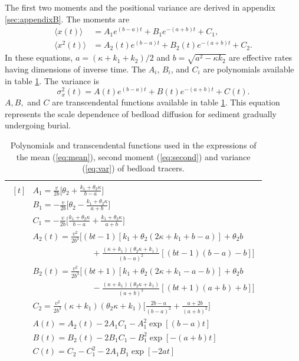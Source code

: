 \documentclass[draft,grl]{agujournal2018}
\newcommand\be{\begin{equation}}
\newcommand\ee{\end{equation}}
\newcommand\bra{\langle}
\newcommand\ket{\rangle}
\begin{document}
 The first two moments and the positional variance are derived in appendix \ref{sec:appendixB}.
The moments are
\begin{align}
\bra x(t) \ket &= A_1 e^{(b-a)t}+B_1e^{-(a+b)t}+C_1, \label{eq:mean}\\
\bra x^2(t) \ket &= A_2(t)e^{(b-a)t}+B_2(t)e^{-(a+b)t}+C_2. \label{eq:second}
\end{align}
In these equations, $a = (\kappa + k_1+k_2)/2$ and $b = \sqrt{a^2-\kappa k_2}$ are effective rates having dimensions of inverse time.
The $A_i$, $B_i$, and $C_i$ are polynomials available in table \ref{table:params}.
The variance is
\be \sigma_x^2(t) = A(t)e^{(b-a)t} + B(t)e^{-(a+b)t} + C(t). \label{eq:var}\ee
$A, B,$ and $C$ are transcendental functions available in table \ref{table:params}.
This equation represents the scale dependence of bedload diffusion for sediment gradually undergoing burial.
\begin{table}[!h]
	\centering
	\caption{Polynomials and transcendental functions used in the expressions of the mean (\ref{eq:mean}), second moment (\ref{eq:second}) and variance (\ref{eq:var}) of bedload tracers.}
	\label{table:params}
	\begin{tabular}{c}
		\toprule
		$\begin{aligned}[t]
		&A_1 = \frac{v}{2b}\big[\theta_2+\frac{k_1+\theta_2\kappa}{b-a}\big] \\
		&B_1 = -\frac{v}{2b}\big[\theta_2-\frac{k_1+\theta_2 \kappa}{a+b}\big] \\
		&C_1 =  -\frac{v}{2b}\big[\frac{k_1+\theta_2 \kappa}{b-a}+\frac{k_1+\theta_2 \kappa}{a+b}\big]\\
		&A_2(t) = \frac{v^2}{2b^3}\Big[(bt-1)[k_1+\theta_2(2\kappa + k_1 + b-a)]+\theta_2b \\
		&\hspace{3cm} + \frac{(\kappa+k_1)(\theta_2\kappa+k_1)}{(b-a)^2}[(bt-1)(b-a)-b]\Big]\\
		&B_2(t) = \frac{v^2}{2b^3}\Big[(bt+1)[k_1 + \theta_2(2\kappa+k_1-a-b)]+\theta_2b\\
		&\hspace{3cm} -\frac{(\kappa+k_1)(\theta_2\kappa+k_1)}{(a+b)^2}[(bt+1)(a+b)+b]\Big]\\
		&C_2 = \frac{v^2}{2b^3}(\kappa+k_1)(\theta_2 \kappa + k_1)\Big[\frac{2b-a}{(b-a)^2}+\frac{a+2b}{(a+b)^2}\Big]\\
		&A(t) = A_2(t)-2A_1C_1 - A_1^2\exp[(b-a)t]\\
		&B(t) = B_2(t)-2B_1C_1 - B_1^2\exp[-(a+b)t]\\
		&C(t) = C_2-C_1^2-2A_1B_1\exp[-2at]\\			
		\end{aligned}$\\
		\bottomrule
	\end{tabular}
\end{table}
\end{document}
